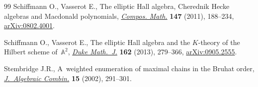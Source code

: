 \documentclass[10pt,a4paper]{amsart}
\numberwithin{equation}{section}
\theoremstyle{definition}
\begin{document}
\begin{thebibliography}{99}
Schiffmann O., Vasserot E., The elliptic {H}all algebra, {C}herednik {H}ecke
 algebras and {M}acdonald polynomials,
 \href{https://doi.org/10.1112/S0010437X10004872}{\textit{Compos. Math.}}
 \textbf{147} (2011), 188--234,
 \href{http://arxiv.org/abs/0802.4001}{arXiv:0802.4001}.

Schiffmann O., Vasserot E., The elliptic {H}all algebra and the {$K$}-theory of
 the {H}ilbert scheme of~{${\mathbb A}^2$},
 \href{https://doi.org/10.1215/00127094-1961849}{\textit{Duke Math.~J.}}
 \textbf{162} (2013), 279--366,
 \href{http://arxiv.org/abs/0905.2555}{arXiv:0905.2555}.

Stembridge J.R., A~weighted enumeration of maximal chains in the {B}ruhat
 order, \href{https://doi.org/10.1023/A:1015068609503}{\textit{J.~Algebraic
 Combin.}} \textbf{15} (2002), 291--301.

\end{thebibliography}
\end{document}
